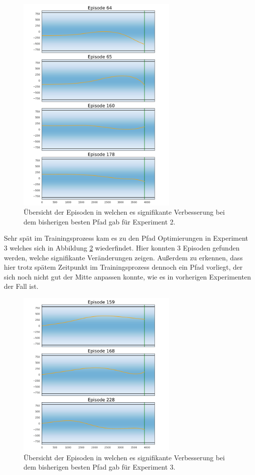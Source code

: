 \documentclass[]{iat}
\begin{document}
\begin{figure}[H]
    \includegraphics[width=0.7\textwidth]{graphics/optimum_s2/optimum_s2.png}
    \centering
    \caption{Übersicht der Episoden in welchen es signifikante Verbesserung bei dem bisherigen besten Pfad gab für Experiment 2.}
    \label{abb:opti2}
\end{figure}
Sehr spät im Trainingsprozess kam es zu den Pfad Optimierungen in Experiment 3 welches sich in Abbildung \ref{abb:opti3} wiederfindet. Hier konnten 3 Episoden gefunden werden, welche signifikante Veränderungen zeigen. Außerdem zu erkennen, dass hier trotz spätem Zeitpunkt im Trainingsprozess dennoch ein Pfad vorliegt, der sich noch nicht gut der Mitte anpassen konnte, wie es in vorherigen Experimenten der Fall ist.
\begin{figure}[H]
    \includegraphics[width=0.7\textwidth]{graphics/optimum_s3/optimum_s3.png}
    \centering
    \caption{Übersicht der Episoden in welchen es signifikante Verbesserung bei dem bisherigen besten Pfad gab für Experiment 3.}
    \label{abb:opti3}
\end{figure}
\end{document}
